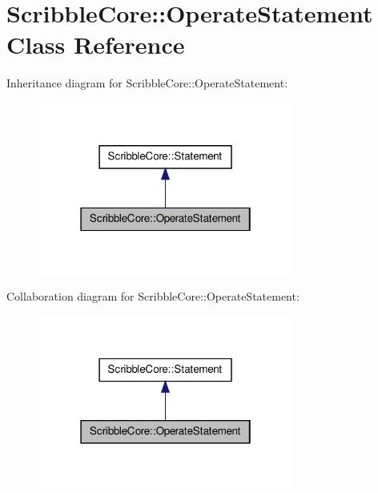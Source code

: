 \hypertarget{class_scribble_core_1_1_operate_statement}{\section{Scribble\-Core\-:\-:Operate\-Statement Class Reference}
\label{class_scribble_core_1_1_operate_statement}
}


Inheritance diagram for Scribble\-Core\-:\-:Operate\-Statement\-:\nopagebreak
\begin{figure}[H]
\begin{center}
\leavevmode
\includegraphics[width=238pt]{class_scribble_core_1_1_operate_statement__inherit__graph}
\end{center}
\end{figure}


Collaboration diagram for Scribble\-Core\-:\-:Operate\-Statement\-:\nopagebreak
\begin{figure}[H]
\begin{center}
\leavevmode
\includegraphics[width=238pt]{class_scribble_core_1_1_operate_statement__coll__graph}
\end{center}
\end{figure}
